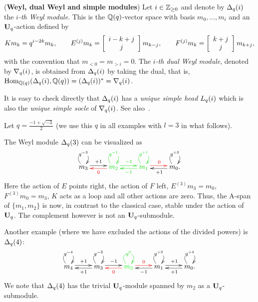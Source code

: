 \begin{defn}(\textbf{Weyl, dual Weyl and simple modules})\label{defn-weyl}
Let $i\in\mathbb{Z}_{\geq 0}$ and denote 
by $\Delta_q({i})$ the $i$\textit{-th Weyl module}. 
This is the $\mathbb{Q}(q)$-vector space 
with basis $m_0,\dots,m_i$ and an $\boldsymbol{\mathrm{U}}_q$-action defined by
\[
Km_k=q^{i-2k}m_k,\quad\quad E^{(j)}m_k=\left[ \begin{array}{c} i-k+j \\ j \\ \end{array} \right]m_{k-j},\quad\quad F^{(j)}m_k=\left[ \begin{array}{c} k+j \\ j \\ \end{array} \right]m_{k+j},
\]
with the convention that $m_{<0}=m_{>i}=0$. 
The \textit{$i$-th dual Weyl module}, 
denoted by $\nabla_q({i})$, is obtained from 
$\Delta_q({i})$ by taking the dual, that is, 
$\mathrm{Hom}_{\mathbb{Q}(q)}(\Delta_q({i}),\mathbb{Q}(q))=(\Delta_q(i))^*=\nabla_q({i})$.
\end{defn}


It is easy to check directly that 
$\Delta_q({i})$ has a \textit{unique simple head} $L_q({i})$ which 
is also the \textit{unique simple socle} of $\nabla_q({i})$. 
See also~\cite[Section~4]{apw}.



\begin{ex}\label{ex-weyl}
Let $q=\frac{-1+\sqrt{-3}}{2}$ (we use this $q$ in all examples with $l=3$ in what follows).



The Weyl module $\Delta_q({3})$ can be visualized as
\begin{equation}\label{eq-example1}
\xymatrix{
  m_3  \ar@<2pt>[r]^{+1}\ar@(ul,ur)|{q^{-3}}  &  {\color{colormy}m_2}  \ar@[mycolor]@<2pt>[l]^{{\color{mycolor} 0}}\ar@[colormy]@<2pt>[r]^{{\color{colormy} -1}}\ar@[colormy]@(ul,ur)|{{\color{colormy}q^{-1}}} & {\color{colormy}m_1}  \ar@[mycolor]@<2pt>[r]^{{\color{mycolor} 0}}\ar@[colormy]@<2pt>[l]^{{\color{colormy}-1}}\ar@[colormy]@(ul,ur)|{{\color{colormy}q^{+1}}}  &  m_0.  \ar@<2pt>[l]^{+1}\ar@(ul,ur)|{q^{+3}} \\
}
\end{equation}
Here the action of 
$E$ points right, the action of 
$F$ left, $E^{(3)}m_3=m_0$, $F^{(3)}m_0=m_3$, $K$ acts as a loop 
and all other actions are zero. 
Thus, the $\mathrm{A}$-span of $\{m_1,m_2\}$ is now, 
in contrast to the classical case, stable under the action of $\boldsymbol{\mathrm{U}}_q$. The complement 
however is not an $\boldsymbol{\mathrm{U}}_q$-submodule.



Another example (where we have excluded the actions of the divided powers) is $\Delta_q({4})$:
\begin{equation}\label{eq-example2}
\xymatrix{
  m_4  \ar@<2pt>[r]^{+1}\ar@(ul,ur)|{q^{-4}}  &  m_3  \ar@<2pt>[l]^{+1}\ar@<2pt>[r]^{-1}\ar@(ul,ur)|{q^{-2}} & {\color{green} m_2}  \ar@[mycolor]@<2pt>[r]^{{\color{mycolor} 0}}\ar@[red]@<2pt>[l]^{{\color{mycolor} 0}}\ar@[colormy]@(ul,ur)|{{\color{colormy}q^{0}}} & m_1  \ar@<2pt>[r]^{+1}\ar@<2pt>[l]^{-1}\ar@(ul,ur)|{q^{+2}} &  m_0.  \ar@<2pt>[l]^{+1}\ar@(ul,ur)|{q^{+4}} \\
}
\end{equation}
We note that $\Delta_q({4})$ has the 
trivial $\boldsymbol{\mathrm{U}}_q$-module spanned by $m_2$ as a $\boldsymbol{\mathrm{U}}_q$-submodule.
\end{ex}




